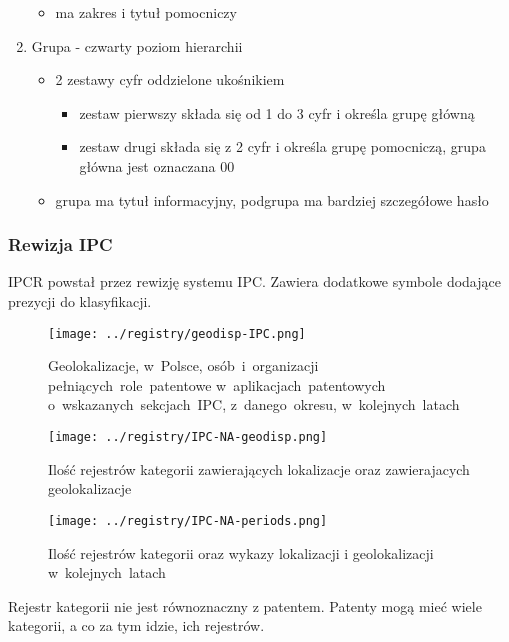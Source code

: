 \begin{enumerate}
\begin{itemize}
        \item ma zakres i tytuł pomocniczy
    \end{itemize}
    \item Grupa - czwarty poziom hierarchii
    \begin{itemize}
        \item 2 zestawy cyfr oddzielone ukośnikiem
        \begin{itemize}
            \item zestaw pierwszy składa się od 1 do 3 cyfr i określa grupę główną
            \item zestaw drugi składa się z 2 cyfr i określa grupę pomocniczą, grupa główna jest oznaczana 00
        \end{itemize}
        \item grupa ma tytuł informacyjny, podgrupa ma bardziej szczegółowe hasło
    \end{itemize}
\end{enumerate}



\subsubsection{Rewizja \ac{IPC}}

\ac{IPCR} powstał przez rewizję systemu \ac{IPC}. Zawiera dodatkowe
symbole dodające prezycji do klasyfikacji.

\begin{figure}[H]\centering
\texttt{[image: ../registry/geodisp-IPC.png]}
\caption{Geolokalizacje,
         w~Polsce,
         osób~i~organizacji 
         pełniących~role~patentowe 
         w~aplikacjach~patentowych
         o~wskazanych~sekcjach~IPC,
         z~danego~okresu,
         w~kolejnych~latach}
\label{fig:geodisp.png}
\end{figure}



\begin{figure}[H]\centering
\texttt{[image: ../registry/IPC-NA-geodisp.png]}
\caption{Ilość rejestrów kategorii
         zawierających lokalizacje oraz
         zawierajacych geolokalizacje}
\label{fig:geodisp.png}
\end{figure}



\begin{figure}[H]\centering
\texttt{[image: ../registry/IPC-NA-periods.png]}
\caption{Ilość rejestrów kategorii
         oraz wykazy lokalizacji i geolokalizacji
         w~kolejnych~latach}
\label{fig:geodisp.png}
\end{figure}

\begin{uwaga}
Rejestr kategorii nie jest równoznaczny z patentem. Patenty
mogą mieć wiele kategorii, a co za tym idzie, ich rejestrów.
\end{uwaga}